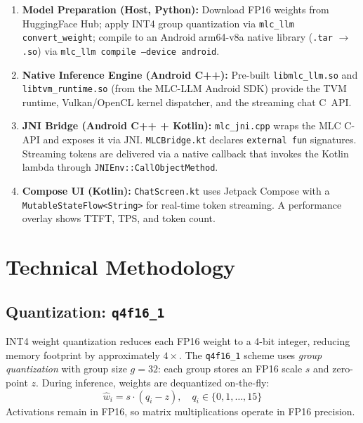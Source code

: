\documentclass[12pt,letterpaper]{article}
\begin{document}
\begin{enumerate}
    \item \textbf{Model Preparation (Host, Python):}
          Download FP16 weights from HuggingFace Hub;
          apply INT4 group quantization via \texttt{mlc\_llm convert\_weight};
          compile to an Android arm64-v8a native library
          (\texttt{.tar} $\to$ \texttt{.so}) via \texttt{mlc\_llm compile --device android}.

    \item \textbf{Native Inference Engine (Android C++):}
          Pre-built \texttt{libmlc\_llm.so} and \texttt{libtvm\_runtime.so}
          (from the MLC-LLM Android SDK) provide the TVM runtime,
          Vulkan/OpenCL kernel dispatcher, and the streaming chat C~API.

    \item \textbf{JNI Bridge (Android C++ + Kotlin):}
          \texttt{mlc\_jni.cpp} wraps the MLC C-API and exposes it via JNI.
          \texttt{MLCBridge.kt} declares \texttt{external fun} signatures.
          Streaming tokens are delivered via a native callback that invokes
          the Kotlin lambda through \texttt{JNIEnv::CallObjectMethod}.

    \item \textbf{Compose UI (Kotlin):}
          \texttt{ChatScreen.kt} uses Jetpack Compose with a
          \texttt{MutableStateFlow<String>} for real-time token streaming.
          A performance overlay shows TTFT, TPS, and token count.
\end{enumerate}

\section{Technical Methodology}

\subsection{Quantization: \texttt{q4f16\_1}}

INT4 weight quantization reduces each FP16 weight to a 4-bit integer, reducing
memory footprint by approximately $4\times$.
The \texttt{q4f16\_1} scheme uses \textit{group quantization} with group size
$g = 32$: each group stores an FP16 scale $s$ and zero-point $z$.
During inference, weights are dequantized on-the-fly:
\[
    \hat{w}_i = s \cdot (q_i - z), \quad q_i \in \{0, 1, \ldots, 15\}
\]
Activations remain in FP16, so matrix multiplications operate in FP16 precision.
\end{document}
